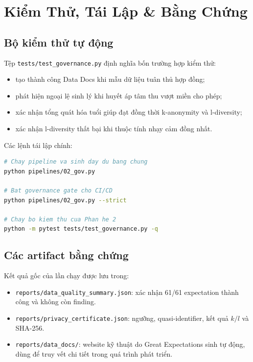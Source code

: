 \documentclass[11pt,a4paper]{article}
\begin{document}
\section{Kiểm Thử, Tái Lập \& Bằng Chứng}

\subsection{Bộ kiểm thử tự động}

Tệp \texttt{tests/test\_governance.py} định nghĩa bốn trường hợp kiểm thử:

\begin{itemize}
    \item tạo thành công Data Docs khi mẫu dữ liệu tuân thủ hợp đồng;
    \item phát hiện ngoại lệ sinh lý khi huyết áp tâm thu vượt miền cho phép;
    \item xác nhận tổng quát hóa tuổi giúp đạt đồng thời k-anonymity và l-diversity;
    \item xác nhận l-diversity thất bại khi thuộc tính nhạy cảm đồng nhất.
\end{itemize}

Các lệnh tái lập chính:

\begin{lstlisting}[language=bash]
# Chay pipeline va sinh day du bang chung
python pipelines/02_gov.py

# Bat governance gate cho CI/CD
python pipelines/02_gov.py --strict

# Chay bo kiem thu cua Phan he 2
python -m pytest tests/test_governance.py -q
\end{lstlisting}

\subsection{Các artifact bằng chứng}

Kết quả gốc của lần chạy được lưu trong:

\begin{itemize}
    \item \texttt{reports/data\_quality\_summary.json}: xác nhận 61/61 expectation thành công và không còn finding.
    \item \texttt{reports/privacy\_certificate.json}: ngưỡng, quasi-identifier, kết quả $k/l$ và SHA-256.
    \item \texttt{reports/data\_docs/}: website kỹ thuật do Great Expectations sinh tự động, dùng để truy vết chi tiết trong quá trình phát triển.
\end{itemize}
\end{document}
